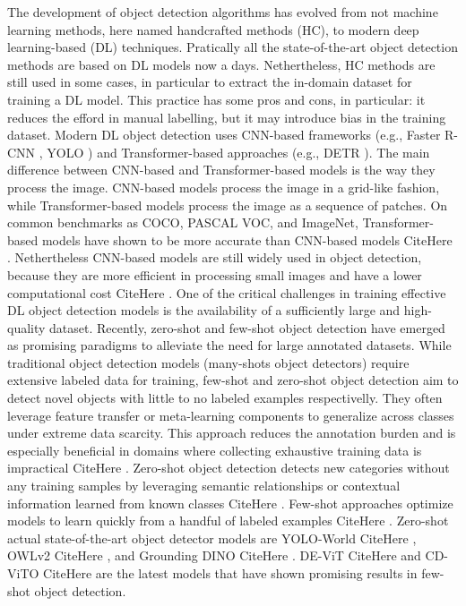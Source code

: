 \documentclass[journal,article,submit,pdftex,moreauthors]{Definitions/mdpi}
\begin{document}
The development of object detection algorithms has evolved from not machine learning methods, 
here named handcrafted methods (HC), to modern deep learning-based (DL) techniques.
Pratically all the state-of-the-art object detection methods are based on DL models
now a days. Nethertheless, HC methods are still used in some cases, in particular
to extract the in-domain dataset for training a DL model. This practice has some pros and cons,
in particular: it reduces the efford in manual labelling, but it may introduce bias in the training dataset. 
Modern DL object detection uses CNN-based frameworks (e.g., Faster R-CNN \cite{FasterRCNNRealTime}, YOLO \cite{YouOnlyLook}) 
and Transformer-based approaches (e.g., DETR \cite{carionEndtoEndObjectDetection2020}).
The main difference between CNN-based and Transformer-based models is the way they
process the image. CNN-based models process the image in a grid-like fashion,
while Transformer-based models process the image as a sequence of patches.
On common benchmarks as COCO, PASCAL VOC, and ImageNet, Transformer-based models have shown 
to be more accurate than CNN-based models CiteHere .
Nethertheless CNN-based models are still widely used in object detection, because they are
more efficient in processing small images and have a lower computational cost CiteHere . 
One of the critical challenges in training effective DL object detection models is 
the availability of a sufficiently large and high-quality dataset. 
Recently, zero-shot and few-shot object detection have emerged as promising paradigms
to alleviate the need for large annotated datasets.
While traditional object detection models (many-shots object detectors) require extensive labeled data for training, 
few-shot and zero-shot object detection aim to detect novel objects with little to 
no labeled examples respectivelly.
They often leverage feature transfer or meta-learning components to generalize 
across classes under extreme data scarcity. This approach reduces the annotation 
burden and is especially beneficial in domains where collecting exhaustive training 
data is impractical CiteHere .
Zero-shot object detection detects new categories without any training samples by 
leveraging semantic relationships or contextual information learned from known classes CiteHere . 
Few-shot approaches optimize models to learn quickly from a handful of labeled examples CiteHere . 
Zero-shot actual state-of-the-art object detector models are YOLO-World CiteHere , OWLv2 CiteHere , and Grounding DINO CiteHere .  
DE-ViT CiteHere  and CD-ViTO CiteHere  are the latest models that have shown promising results in few-shot
object detection.
\end{document}
